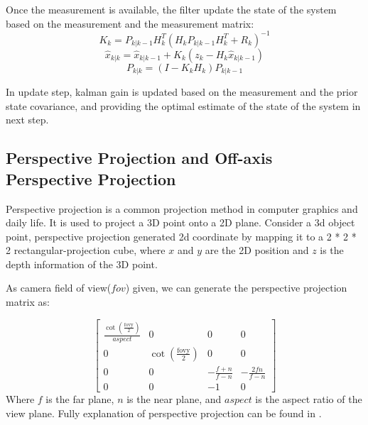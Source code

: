 Once the measurement is available, the filter update the state of the system based on the measurement and the measurement matrix:
\begin{equation}
        K_k = P_{k|k-1} H_k^T (H_k P_{k|k-1} H_k^T + R_k)^{-1}
\end{equation}
\begin{equation}
        \hat{x}_{k|k} = \hat{x}_{k|k-1} + K_k(z_k - H_k \hat{x}_{k|k-1})
\end{equation}
\begin{equation}
        P_{k|k} = (I - K_k H_k) P_{k|k-1} 
\end{equation}

In update step, kalman gain is updated based on the measurement and the prior state covariance, and providing the optimal estimate of the state of the system in next step.

\subsection{Perspective Projection and Off-axis Perspective Projection}

Perspective projection is a common projection method in computer graphics and daily life. It is used to project a 3D point onto a 2D plane. Consider a 3d object point, perspective projection generated 2d coordinate by mapping it to a 2 * 2 * 2 rectangular-projection cube, where $x$ and $y$ are the 2D position and $z$ is the depth information of the 3D point.

As camera field of view($fov$) given, we can generate the perspective projection matrix as:

\[
\begin{bmatrix}
\frac{\cot \left( \frac{\text{fovy}}{2} \right)} {aspect} & 0 & 0 & 0 \\
0 & \cot \left( \frac{\text{fovy}}{2} \right) & 0 & 0 \\
0 & 0 & -\frac{f+n}{f-n} & -\frac{2fn}{f-n} \\
0 & 0 & -1 & 0
\end{bmatrix}
\]
Where $f$ is the far plane, $n$ is the near plane, and $aspect$ is the aspect ratio of the view plane. Fully explanation of perspective projection can be found in \cite{ahn_opengl_projection_matrix}.
    
